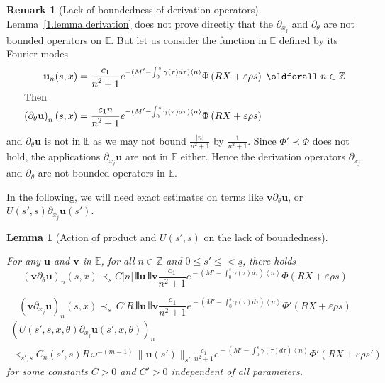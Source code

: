 \documentclass[10pt]{amsart}
\newtheorem{lemm}[cdrthm]{Lemma}
\theoremstyle{definition}
\newtheorem{rema}[cdrthm]{Remark}
\theoremstyle{plain}
\newcommand*\e{\varepsilon}
\newcommand*\Z{{\mathbb Z}}
\newcommand{\dptl}{\partial}%
\newcommand*\EE{{\mathbb E}}
\newcommand*\g{\gamma}
\newcommand{\ubf}{{\mathbf u}}
\newcommand{\vbf}{{\mathbf v}}
\newcommand*\dsp{\displaystyle}
\newcommand*\und{\underline}
\DeclarePairedDelimiter{\VERT}{|\mkern -1.6mu|\mkern -1.6mu|}{|\mkern -1.6mu|\mkern -1.6mu|}
\renewcommand*{\forall}{\mathrel{\oldforall}}
\begin{document}
\begin{rema}[Lack of boundedness of derivation operators]
Lemma~\ref{1.lemma.derivation} does not prove directly that the $\dptl_{x_j}$ and $\dptl_{\theta}$ are not bounded operators on $\EE$. But let us consider the function in $\EE$ defined by its Fourier modes
\begin{align*}
\ubf_n(s,x) &= \frac{\dsp c_1}{\dsp n^2+1} e^{{}-(M'- \int_{0}^{s}\g(\tau) d\tau) \left<n\right>} \Phi\left(R X+\e\rho s\right) \, \forall n\in\Z\\
\intertext{Then}
\left(\dptl_{\theta}\ubf\right)_n(s,x) &= \frac{\dsp c_1 n}{\dsp n^2+1} e^{{}-(M'- \int_{0}^{s}\g(\tau) d\tau) \left<n\right>} \Phi\left(R X+\e\rho s\right)
\end{align*}
and $\dptl_{\theta}\ubf$ is not in $\EE$ as we may not bound $ \frac{|n|}{n^2+1}$ by $ \frac{1}{n^2+1} $. Since $\Phi' \prec \Phi$ does not hold, the applications $\dptl_{x_j} \ubf$ are not in $\EE$ either. Hence the derivation operators $\dptl_{x_j}$ and $\dptl_{\theta}$ are not bounded operators in $\EE$.
\end{rema}

In the following, we will need exact estimates on terms like $\vbf\dptl_{\theta}\ubf$, or $U(s',s)\dptl_{x_j}\ubf(s')$.

\begin{lemm}[Action of product and $U(s',s)$ on the lack of boundedness]\label{1.lemma.product.lack}

For any $\ubf$ and $\vbf$ in $\EE$, for all $n\in\Z$ and $0\leq s' \leq <\und{s}$, there holds
\begin{equation}\label{1.action.product.dtheta}
(\vbf\dptl_{\theta}\ubf)_n(s,x) \prec_{s} C|n| \,\VERT{\ubf}\, \VERT{\vbf} \frac{\dsp c_1}{\dsp n^2+1} e^{{}-(M'- \int_{0}^{s}\g(\tau) d\tau) \left<n\right>} \Phi\left(R X+\e\rho s\right) 
\end{equation}

\begin{equation}\label{1.action.product.dy}
(\vbf\dptl_{x_j}\ubf)_n(s,x) \prec_{s} \,C'R\, \VERT{\ubf}\, \VERT{\vbf} \frac{\dsp c_1}{\dsp n^2+1} e^{{}-(M'- \int_{0}^{s}\g(\tau) d\tau) \left<n\right>} \Phi'\left(R X+\e\rho s\right) 
\end{equation}
\begin{multline}\label{1.action.U.dy}
(U(s',s,x,\theta)\dptl_{x_j}\ubf(s',x,\theta))_n \\
\prec_{s',s} C_n(s',s)R\, \omega^{-(m-1)}\,\|\ubf(s')\|_{s'} \frac{\dsp c_1}{\dsp n^2+1} e^{{}-(M'- \int_{0}^{s}\g(\tau) d\tau) \left<n\right>} \Phi'\left(R X+\e\rho s'\right) 
\end{multline}
for some constants $C>0$ and $C'>0$ independent of all parameters.
\end{lemm}
\end{document}
